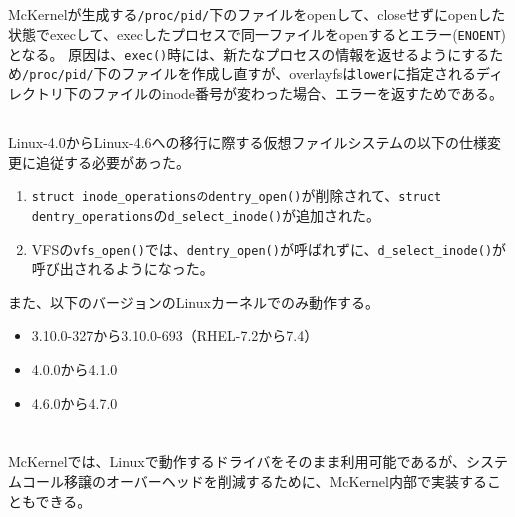 \documentclass[twoside,11pt,fleqn]{book}
\begin{document}
\begin{table}[!h]
\begin{tabular}{|p{0.30\linewidth}|p{0.65\linewidth}|}
\end{tabular}
\vspace{-0em}
\end{table}
\FloatBarrier

\subsection{}
McKernelが生成する\texttt{/proc/{\lbrack}pid{\rbrack}/}下のファイルをopenして、closeせずにopenした状態でexecして、execしたプロセスで同一ファイルをopenするとエラー(\texttt{ENOENT})となる。
原因は、\texttt{exec()}時には、新たなプロセスの情報を返せるようにするため\texttt{/proc/{\lbrack}pid{\rbrack}/}下のファイルを作成し直すが、overlayfsは\texttt{lower}に指定されるディレクトリ下のファイルのinode番号が変わった場合、エラーを返すためである。

\subsection{}
Linux-4.0からLinux-4.6への移行に際する仮想ファイルシステムの以下の仕様変更に追従する必要があった。
\begin{enumerate}
\item \texttt{struct inode\_operationsのdentry\_open()}が削除されて、\texttt{struct dentry\_operations}の\texttt{d\_select\_inode()}が追加された。
\item VFSの\texttt{vfs\_open()}では、\texttt{dentry\_open()}が呼ばれずに、\texttt{d\_select\_inode()}が呼び出されるようになった。
\end{enumerate}

また、以下のバージョンのLinuxカーネルでのみ動作する。
\begin{itemize}
\item 3.10.0-327から3.10.0-693（RHEL-7.2から7.4）
\item 4.0.0から4.1.0
\item 4.6.0から4.7.0
\end{itemize}




\section{}
McKernelでは、Linuxで動作するドライバをそのまま利用可能であるが、システムコール移譲のオーバーヘッドを削減するために、McKernel内部で実装することもできる。
\end{document}
